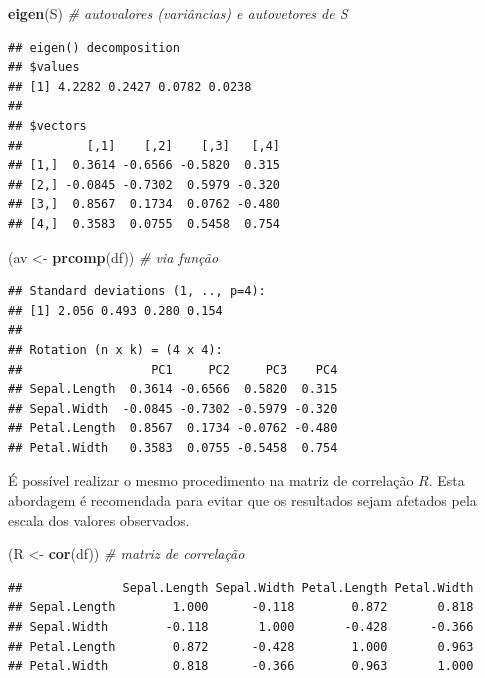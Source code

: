 \documentclass[
]{book}
\newenvironment{Shaded}{\begin{snugshade}}{\end{snugshade}}
\newcommand{\CommentTok}[1]{\textcolor[rgb]{0.56,0.35,0.01}{\textit{#1}}}
\newcommand{\KeywordTok}[1]{\textcolor[rgb]{0.13,0.29,0.53}{\textbf{#1}}}
\newcommand{\NormalTok}[1]{#1}
\newcommand{\StringTok}[1]{\textcolor[rgb]{0.31,0.60,0.02}{#1}}
\theoremstyle{definition}
\theoremstyle{definition}
\theoremstyle{definition}
\theoremstyle{remark}
\begin{document}
\begin{Shaded}
\begin{Highlighting}[]
\KeywordTok{eigen}\NormalTok{(S)            }\CommentTok{\# autovalores (variâncias) e autovetores de S}
\end{Highlighting}
\end{Shaded}

\begin{verbatim}
## eigen() decomposition
## $values
## [1] 4.2282 0.2427 0.0782 0.0238
## 
## $vectors
##         [,1]    [,2]    [,3]   [,4]
## [1,]  0.3614 -0.6566 -0.5820  0.315
## [2,] -0.0845 -0.7302  0.5979 -0.320
## [3,]  0.8567  0.1734  0.0762 -0.480
## [4,]  0.3583  0.0755  0.5458  0.754
\end{verbatim}

\begin{Shaded}
\begin{Highlighting}[]
\NormalTok{(av \textless{}{-}}\StringTok{ }\KeywordTok{prcomp}\NormalTok{(df))  }\CommentTok{\# via função}
\end{Highlighting}
\end{Shaded}

\begin{verbatim}
## Standard deviations (1, .., p=4):
## [1] 2.056 0.493 0.280 0.154
## 
## Rotation (n x k) = (4 x 4):
##                  PC1     PC2     PC3    PC4
## Sepal.Length  0.3614 -0.6566  0.5820  0.315
## Sepal.Width  -0.0845 -0.7302 -0.5979 -0.320
## Petal.Length  0.8567  0.1734 -0.0762 -0.480
## Petal.Width   0.3583  0.0755 -0.5458  0.754
\end{verbatim}

É possível realizar o mesmo procedimento na matriz de correlação \(R\). Esta abordagem é recomendada para evitar que os resultados sejam afetados pela escala dos valores observados.

\begin{Shaded}
\begin{Highlighting}[]
\NormalTok{(R \textless{}{-}}\StringTok{ }\KeywordTok{cor}\NormalTok{(df))  }\CommentTok{\# matriz de correlação}
\end{Highlighting}
\end{Shaded}

\begin{verbatim}
##              Sepal.Length Sepal.Width Petal.Length Petal.Width
## Sepal.Length        1.000      -0.118        0.872       0.818
## Sepal.Width        -0.118       1.000       -0.428      -0.366
## Petal.Length        0.872      -0.428        1.000       0.963
## Petal.Width         0.818      -0.366        0.963       1.000
\end{verbatim}
\end{document}
